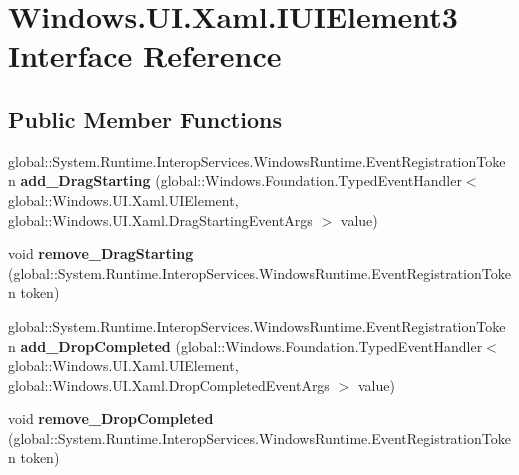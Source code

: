 \hypertarget{interface_windows_1_1_u_i_1_1_xaml_1_1_i_u_i_element3}{}\section{Windows.\+U\+I.\+Xaml.\+I\+U\+I\+Element3 Interface Reference}
\label{interface_windows_1_1_u_i_1_1_xaml_1_1_i_u_i_element3}
\subsection*{Public Member Functions}
\begin{DoxyCompactItemize}
\item 
\mbox{\label{interface_windows_1_1_u_i_1_1_xaml_1_1_i_u_i_element3_a65b4b6369aa0a951c30016151b14ac95}} 
global\+::\+System.\+Runtime.\+Interop\+Services.\+Windows\+Runtime.\+Event\+Registration\+Token {\bfseries add\+\_\+\+Drag\+Starting} (global\+::\+Windows.\+Foundation.\+Typed\+Event\+Handler$<$ global\+::\+Windows.\+U\+I.\+Xaml.\+U\+I\+Element, global\+::\+Windows.\+U\+I.\+Xaml.\+Drag\+Starting\+Event\+Args $>$ value)
\item 
\mbox{\label{interface_windows_1_1_u_i_1_1_xaml_1_1_i_u_i_element3_a9763c1f3007106faa5edbab72152e864}} 
void {\bfseries remove\+\_\+\+Drag\+Starting} (global\+::\+System.\+Runtime.\+Interop\+Services.\+Windows\+Runtime.\+Event\+Registration\+Token token)
\item 
\mbox{\label{interface_windows_1_1_u_i_1_1_xaml_1_1_i_u_i_element3_aa1dd03e3acd153862a9ab2a172d49cd0}} 
global\+::\+System.\+Runtime.\+Interop\+Services.\+Windows\+Runtime.\+Event\+Registration\+Token {\bfseries add\+\_\+\+Drop\+Completed} (global\+::\+Windows.\+Foundation.\+Typed\+Event\+Handler$<$ global\+::\+Windows.\+U\+I.\+Xaml.\+U\+I\+Element, global\+::\+Windows.\+U\+I.\+Xaml.\+Drop\+Completed\+Event\+Args $>$ value)
\item 
\mbox{\label{interface_windows_1_1_u_i_1_1_xaml_1_1_i_u_i_element3_ab5b2415864634b87ef93d36e64e197a5}} 
void {\bfseries remove\+\_\+\+Drop\+Completed} (global\+::\+System.\+Runtime.\+Interop\+Services.\+Windows\+Runtime.\+Event\+Registration\+Token token)

\end{DoxyCompactItemize}
